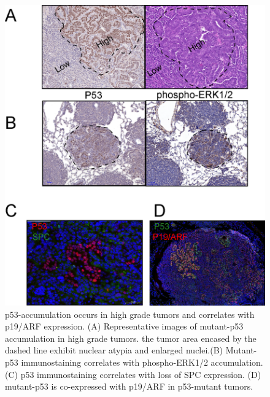 \begin{figure}
\hypertarget{fig:04}{%
\centering
\includegraphics[width=1\textwidth,height=\textheight]{images/p53_5.png}
\caption{p53-accumulation occurs in high grade tumors and correlates with p19/ARF expression. (A) Representative images of mutant-p53 accumulation in high grade tumors. the tumor area encased by the dashed line exhibit nuclear atypia and enlarged nuclei.(B) Mutant-p53 immunostaining correlates with phospho-ERK1/2 accumulation. (C) p53 immunostaining correlates with loss of SPC expression. (D) mutant-p53 is co-expressed with p19/ARF in p53-mutant tumors.}\label{fig:04}
}
\end{figure}


